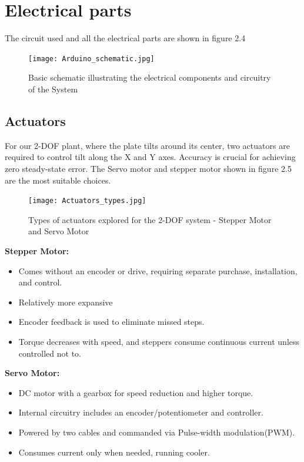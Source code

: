 \section{Electrical parts}
The circuit used and all the electrical parts are shown in figure 2.4
\begin{figure}[h]
    \centering
    \texttt{[image: Arduino\_schematic.jpg]}
    \caption{ Basic schematic illustrating the electrical components and circuitry of the System}
    \label{fig:enter-label}
\end{figure}
\subsection{Actuators}
For our 2-DOF plant, where the plate tilts around its center, two actuators are required to control tilt along the X and Y axes. Accuracy is crucial for achieving zero steady-state error. The Servo motor and stepper motor shown in figure 2.5 are the most suitable choices.\\
\begin{figure}[h]
    \centering
    \texttt{[image: Actuators\_types.jpg]}
    \caption{Types of actuators explored for the 2-DOF system - Stepper Motor and Servo Motor}
    \label{fig:enter-label}
\end{figure}

\textbf{Stepper Motor:}
\begin{itemize}
    \item Comes without an encoder or drive, requiring separate purchase, installation, and control.
    \item Relatively more expansive 
    \item Encoder feedback is used to eliminate missed steps.
    \item Torque decreases with speed, and steppers consume continuous current unless controlled not to.
\end{itemize}

\textbf{Servo Motor:}
\begin{itemize}
    \item DC motor with a gearbox for speed reduction and higher torque.
    \item Internal circuitry includes an encoder/potentiometer and controller.
    \item Powered by two cables and commanded via Pulse-width modulation(PWM).
    \item Consumes current only when needed, running cooler.
\end{itemize}

